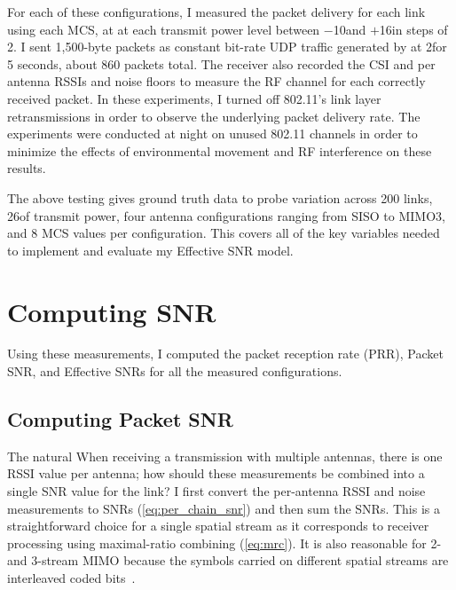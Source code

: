 For each of these configurations, I measured the packet delivery for each link using each MCS, at at each transmit power level between $-$10\dBm and $+$16\dBm in steps of 2\dB. I sent 1,500-byte packets as constant bit-rate UDP traffic generated by  at 2\Mbps for 5 seconds, about 860 packets total. The receiver also recorded the CSI and per antenna RSSIs and noise floors to measure the RF channel for each correctly received packet. In these experiments, I turned off 802.11's link layer retransmissions in order to observe the underlying packet delivery rate. The experiments were conducted at night on unused 802.11 channels in order to minimize the effects of environmental movement and RF interference on these results.


The above testing gives ground truth data to probe variation across 200 links, 26\dB of transmit power, four antenna configurations ranging from SISO to MIMO3, and 8 MCS values per configuration. This covers all of the key variables needed to implement and evaluate my Effective SNR model. 

\section{Computing SNR}
Using these measurements, I computed the packet reception rate (PRR), Packet SNR, and Effective SNRs for all the measured configurations.

\subsection{Computing Packet SNR}
The natural 
When receiving a transmission with multiple antennas, there is one RSSI value per antenna; how should these measurements be combined into a single SNR value for the link? I first convert the per-antenna RSSI and noise measurements to SNRs (\eqref{eq:per_chain_snr}) and then sum the SNRs. This is a straightforward choice for a single spatial stream as it corresponds to receiver processing using maximal-ratio combining (\eqref{eq:mrc}). It is also reasonable for 2- and 3-stream MIMO because the symbols carried on different spatial streams are interleaved coded bits~\cite{80211n}.

